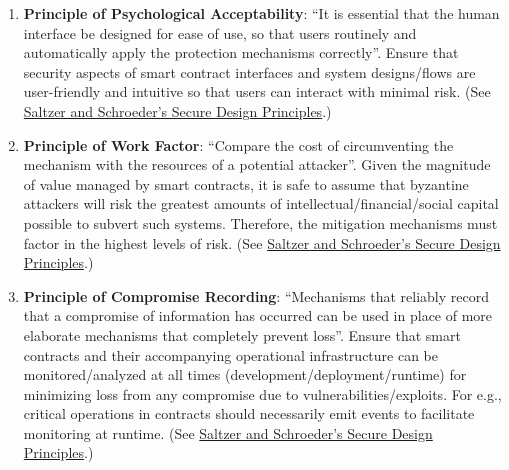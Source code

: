 \begin{enumerate}
\item\textbf{Principle of Psychological Acceptability}: “It is essential that the human interface be designed for ease of use, so that users routinely and automatically apply the protection mechanisms correctly”. Ensure that security aspects of smart contract interfaces and system designs/flows are user-friendly and intuitive so that users can interact with minimal risk. (See \href{https://en.wikipedia.org/wiki/Saltzer\_and\_Schroeder's\_design\_principles}{Saltzer and Schroeder's Secure Design Principles}.)

\item\textbf{Principle of Work Factor}: “Compare the cost of circumventing the mechanism with the resources of a potential attacker”. Given the magnitude of value managed by smart contracts, it is safe to assume that byzantine attackers will risk the greatest amounts of intellectual/financial/social capital possible to subvert such systems. Therefore, the mitigation mechanisms must factor in the highest levels of risk. (See \href{https://en.wikipedia.org/wiki/Saltzer\_and\_Schroeder's\_design\_principles}{Saltzer and Schroeder's Secure Design Principles}.)

\item\textbf{Principle of Compromise Recording}: “Mechanisms that reliably record that a compromise of information has occurred can be used in place of more elaborate mechanisms that completely prevent loss”. Ensure that smart contracts and their accompanying operational infrastructure can be monitored/analyzed at all times (development/deployment/runtime) for minimizing loss from any compromise due to vulnerabilities/exploits. For e.g., critical operations in contracts should necessarily emit events to facilitate monitoring at runtime. (See \href{https://en.wikipedia.org/wiki/Saltzer\_and\_Schroeder's\_design\_principles}{Saltzer and Schroeder's Secure Design Principles}.)

\end{enumerate}
